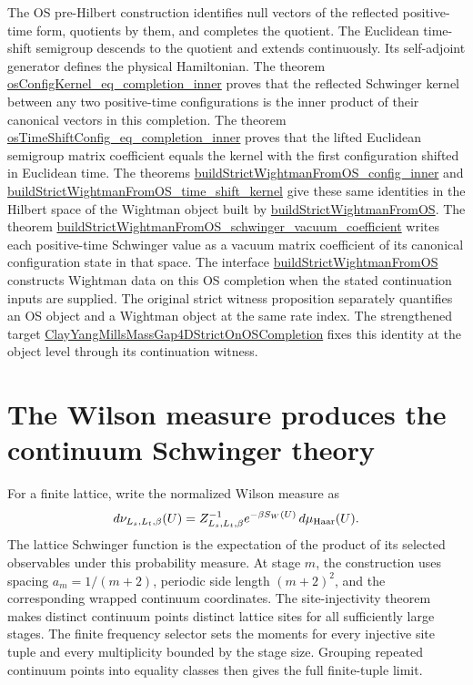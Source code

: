 \documentclass[11pt]{article}
\numberwithin{equation}{section}
\newcommand{\Lean}[1]{\url{#1}}
\begin{document}
The OS pre-Hilbert construction identifies null vectors of the reflected positive-time form, quotients by them, and completes the quotient. The Euclidean time-shift semigroup descends to the quotient and extends continuously. Its self-adjoint generator defines the physical Hamiltonian. The theorem \Lean{osConfigKernel_eq_completion_inner} proves that the reflected Schwinger kernel between any two positive-time configurations is the inner product of their canonical vectors in this completion. The theorem \Lean{osTimeShiftConfig_eq_completion_inner} proves that the lifted Euclidean semigroup matrix coefficient equals the kernel with the first configuration shifted in Euclidean time. The theorems \Lean{buildStrictWightmanFromOS_config_inner} and \Lean{buildStrictWightmanFromOS_time_shift_kernel} give these same identities in the Hilbert space of the Wightman object built by \Lean{buildStrictWightmanFromOS}. The theorem \Lean{buildStrictWightmanFromOS_schwinger_vacuum_coefficient} writes each positive-time Schwinger value as a vacuum matrix coefficient of its canonical configuration state in that space. The interface \Lean{buildStrictWightmanFromOS} constructs Wightman data on this OS completion when the stated continuation inputs are supplied. The original strict witness proposition separately quantifies an OS object and a Wightman object at the same rate index. The strengthened target \Lean{ClayYangMillsMassGap4DStrictOnOSCompletion} fixes this identity at the object level through its continuation witness.

\section{The Wilson measure produces the continuum Schwinger theory}

For a finite lattice, write the normalized Wilson measure as
\[
 d\nu_{L_s,L_t,\beta}(U)
 =Z_{L_s,L_t,\beta}^{-1}e^{-\beta S_W(U)}\,d\mu_{\rm Haar}(U).
\]
The lattice Schwinger function is the expectation of the product of its selected observables under this probability measure. At stage \(m\), the construction uses spacing \(a_m=1/(m+2)\), periodic side length \((m+2)^2\), and the corresponding wrapped continuum coordinates. The site-injectivity theorem makes distinct continuum points distinct lattice sites for all sufficiently large stages. The finite frequency selector sets the moments for every injective site tuple and every multiplicity bounded by the stage size. Grouping repeated continuum points into equality classes then gives the full finite-tuple limit.
\end{document}
